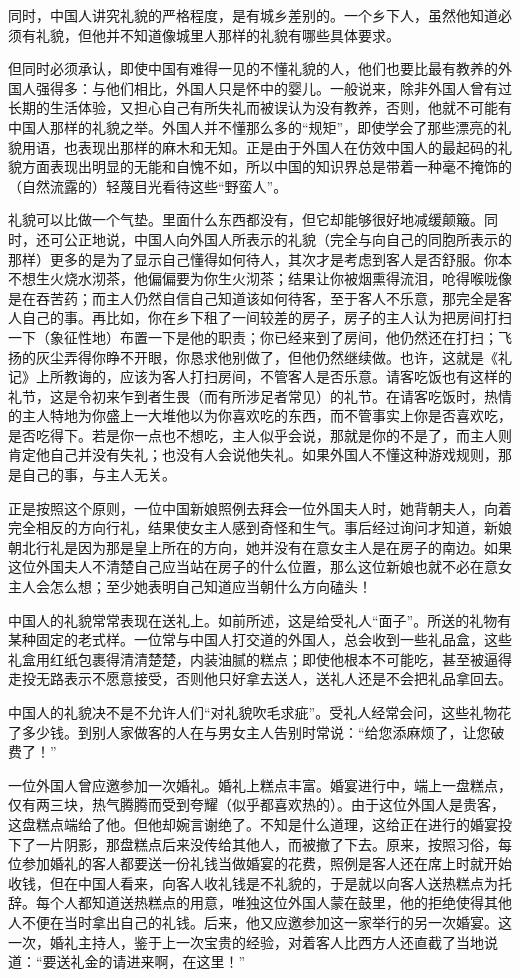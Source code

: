 \documentclass[12pt,oneside]{book}
\begin{document}
\begin{common-format}
同时，中国人讲究礼貌的严格程度，是有城乡差别的。一个乡下人，虽然他知道必须有礼貌，但他并不知道像城里人那样的礼貌有哪些具体要求。 

但同时必须承认，即使中国有难得一见的不懂礼貌的人，他们也要比最有教养的外国人强得多：与他们相比，外国人只是怀中的婴儿。一般说来，除非外国人曾有过长期的生活体验，又担心自己有所失礼而被误认为没有教养，否则，他就不可能有中国人那样的礼貌之举。外国人并不懂那么多的“规矩”，即使学会了那些漂亮的礼貌用语，也表现出那样的麻木和无知。正是由于外国人在仿效中国人的最起码的礼貌方面表现出明显的无能和自愧不如，所以中国的知识界总是带着一种毫不掩饰的（自然流露的）轻蔑目光看待这些“野蛮人”。 

礼貌可以比做一个气垫。里面什么东西都没有，但它却能够很好地减缓颠簸。同时，还可公正地说，中国人向外国人所表示的礼貌（完全与向自己的同胞所表示的那样）更多的是为了显示自己懂得如何待人，其次才是考虑到客人是否舒服。你本不想生火烧水沏茶，他偏偏要为你生火沏茶；结果让你被烟熏得流泪，呛得喉咙像是在吞苦药；而主人仍然自信自己知道该如何待客，至于客人不乐意，那完全是客人自己的事。再比如，你在乡下租了一间较差的房子，房子的主人认为把房间打扫一下（象征性地）布置一下是他的职责；你已经来到了房间，他仍然还在打扫；飞扬的灰尘弄得你睁不开眼，你恳求他别做了，但他仍然继续做。也许，这就是《礼记》上所教诲的，应该为客人打扫房间，不管客人是否乐意。请客吃饭也有这样的礼节，这是令初来乍到者生畏（而有所涉足者常见）的礼节。在请客吃饭时，热情的主人特地为你盛上一大堆他以为你喜欢吃的东西，而不管事实上你是否喜欢吃，是否吃得下。若是你一点也不想吃，主人似乎会说，那就是你的不是了，而主人则肯定他自己并没有失礼；也没有人会说他失礼。如果外国人不懂这种游戏规则，那是自己的事，与主人无关。 

正是按照这个原则，一位中国新娘照例去拜会一位外国夫人时，她背朝夫人，向着完全相反的方向行礼，结果使女主人感到奇怪和生气。事后经过询问才知道，新娘朝北行礼是因为那是皇上所在的方向，她并没有在意女主人是在房子的南边。如果这位外国夫人不清楚自己应当站在房子的什么位置，那么这位新娘也就不必在意女主人会怎么想；至少她表明自己知道应当朝什么方向磕头！ 

中国人的礼貌常常表现在送礼上。如前所述，这是给受礼人“面子”。所送的礼物有某种固定的老式样。一位常与中国人打交道的外国人，总会收到一些礼品盒，这些礼盒用红纸包裹得清清楚楚，内装油腻的糕点；即使他根本不可能吃，甚至被逼得走投无路表示不愿意接受，否则他只好拿去送人，送礼人还是不会把礼品拿回去。 

中国人的礼貌决不是不允许人们“对礼貌吹毛求疵”。受礼人经常会问，这些礼物花了多少钱。到别人家做客的人在与男女主人告别时常说：“给您添麻烦了，让您破费了！” 

一位外国人曾应邀参加一次婚礼。婚礼上糕点丰富。婚宴进行中，端上一盘糕点，仅有两三块，热气腾腾而受到夸耀（似乎都喜欢热的）。由于这位外国人是贵客，这盘糕点端给了他。但他却婉言谢绝了。不知是什么道理，这给正在进行的婚宴投下了一片阴影，那盘糕点后来没传给其他人，而被撤了下去。原来，按照习俗，每位参加婚礼的客人都要送一份礼钱当做婚宴的花费，照例是客人还在席上时就开始收钱，但在中国人看来，向客人收礼钱是不礼貌的，于是就以向客人送热糕点为托辞。每个人都知道送热糕点的用意，唯独这位外国人蒙在鼓里，他的拒绝使得其他人不便在当时拿出自己的礼钱。后来，他又应邀参加这一家举行的另一次婚宴。这一次，婚礼主持人，鉴于上一次宝贵的经验，对着客人比西方人还直截了当地说道：“要送礼金的请进来啊，在这里！”


\end{common-format}
\end{document}
